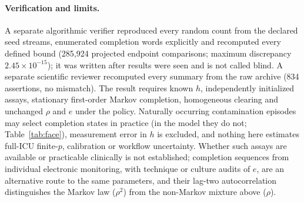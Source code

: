 \paragraph{Verification and limits.} A separate algorithmic verifier reproduced
every random count from the declared seed streams, enumerated completion words
explicitly and recomputed every defined bound (285,924 projected endpoint
comparisons; maximum discrepancy $2.45\times10^{-15}$); it was written after
results were seen and is not called blind. A separate scientific reviewer
recomputed every summary from the raw archive (834 assertions, no mismatch). The
result requires known $h$, independently initialized assays, stationary
first-order Markov completion, homogeneous clearing and unchanged $\rho$ and $e$
under the policy. Naturally occurring contamination episodes may select
completion states in practice (in the model they do not; Table~\ref{tab:face}),
measurement error in $h$ is excluded, and nothing here estimates full-ICU
finite-$p$, calibration or workflow uncertainty. Whether such assays are
available or practicable clinically is not established; completion sequences
from individual electronic monitoring, with technique or culture audits of $e$,
are an alternative route to the same parameters, and their lag-two
autocorrelation distinguishes the Markov law ($\rho^2$) from the non-Markov
mixture above ($\rho$).

